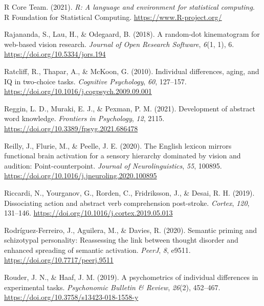 \documentclass[
  12pt,
  man,floatsintext]{apa7}
\newlength{\cslhangindent}
\newlength{\cslentryspacingunit} %
\newenvironment{CSLReferences}[2] %
 {%
  \setlength{\parindent}{0pt}
  \ifodd #1
  \let\oldpar\par
  \def\par{\hangindent=\cslhangindent\oldpar}
  \fi
  \setlength{\parskip}{#2\cslentryspacingunit}
 }%
 {}
\begin{document}
\begin{CSLReferences}{1}{0}
\leavevmode{}%
R Core Team. (2021). \emph{R: A language and environment for statistical computing}. R Foundation for Statistical Computing. \url{https://www.R-project.org/}

\leavevmode{}%
Rajananda, S., Lau, H., \& Odegaard, B. (2018). A random-dot kinematogram for web-based vision research. \emph{Journal of Open Research Software}, \emph{6}(1, 1), 6. \url{https://doi.org/10.5334/jors.194}

\leavevmode{}%
Ratcliff, R., Thapar, A., \& McKoon, G. (2010). Individual differences, aging, and {IQ} in two-choice tasks. \emph{Cognitive Psychology}, \emph{60}, 127--157. \url{https://doi.org/10.1016/j.cogpsych.2009.09.001}

\leavevmode{}%
Reggin, L. D., Muraki, E. J., \& Pexman, P. M. (2021). Development of abstract word knowledge. \emph{Frontiers in Psychology}, \emph{12}, 2115. \url{https://doi.org/10.3389/fpsyg.2021.686478}

\leavevmode{}%
Reilly, J., Flurie, M., \& Peelle, J. E. (2020). The {English} lexicon mirrors functional brain activation for a sensory hierarchy dominated by vision and audition: {Point-counterpoint}. \emph{Journal of Neurolinguistics}, \emph{55}, 100895. \url{https://doi.org/10.1016/j.jneuroling.2020.100895}

\leavevmode{}%
Riccardi, N., Yourganov, G., Rorden, C., Fridriksson, J., \& Desai, R. H. (2019). Dissociating action and abstract verb comprehension post-stroke. \emph{Cortex}, \emph{120}, 131--146. \url{https://doi.org/10.1016/j.cortex.2019.05.013}

\leavevmode{}%
Rodríguez-Ferreiro, J., Aguilera, M., \& Davies, R. (2020). Semantic priming and schizotypal personality: Reassessing the link between thought disorder and enhanced spreading of semantic activation. \emph{PeerJ}, \emph{8}, e9511. \url{https://doi.org/10.7717/peerj.9511}

\leavevmode{}%
Rouder, J. N., \& Haaf, J. M. (2019). A psychometrics of individual differences in experimental tasks. \emph{Psychonomic Bulletin \& Review}, \emph{26}(2), 452--467. \url{https://doi.org/10.3758/s13423-018-1558-y}


\end{CSLReferences}
\end{document}
